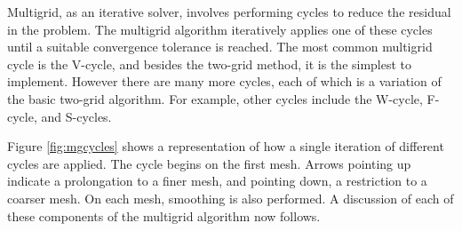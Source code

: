Multigrid, as an iterative solver, involves performing cycles to reduce the residual in the problem.
The multigrid algorithm iteratively applies one of these cycles until a suitable convergence tolerance is reached.
The most common multigrid cycle is the V-cycle, and besides the two-grid method, it is the simplest to implement.
However there are many more cycles, each of which is a variation of the basic two-grid algorithm.
For example, other cycles include the W-cycle, F-cycle, and S-cycles.

Figure \ref{fig:mgcycles} shows a representation of how a single iteration of different cycles are applied.
The cycle begins on the first mesh.
Arrows pointing up indicate a prolongation to a finer mesh, and pointing down, a restriction to a coarser mesh.
On each mesh, smoothing is also performed.
A discussion of each of these components of the multigrid algorithm now follows.


